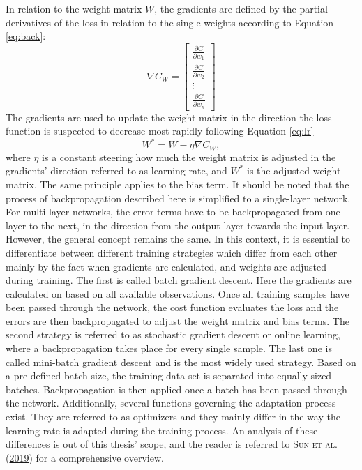 \documentclass[a4paper,11pt]{article}
\begin{document}
In relation to the weight matrix \(W\), the gradients are defined by the partial
derivatives of the loss in relation to the single weights according to Equation
\eqref{eq:back}:
\begin{equation}
\nabla{C_{W}} = 
\begin{bmatrix} \frac{\partial{C}}{\partial{w_1}} \\ 
\frac{\partial{C}}{\partial{w_2}} \\ 
\vdots \\ 
\frac{\partial{C}}{\partial{w_n}} 
\end{bmatrix}
\label{eq:back}
\end{equation}
The gradients are used to update the weight matrix in the direction
the loss function is suspected to decrease most rapidly following Equation \eqref{eq:lr}
\begin{equation}
W^* = W - \eta \nabla{C_{W}},
\label{eq:lr}
\end{equation}
where \(\eta\) is a constant steering how much the weight matrix is adjusted in the
gradients' direction referred to as learning rate, and \(W^*\) is the adjusted weight matrix.
The same principle applies to the bias term. It should be noted that the process
of backpropagation described here is simplified to a single-layer network. For
multi-layer networks, the error terms have to be backpropagated from one layer to
the next, in the direction from the output layer towards the input layer. However, the general concept
remains the same. In this context, it is essential to differentiate between
different training strategies which differ from each other mainly by the fact
when gradients are calculated, and weights are adjusted during training.
The first is called batch gradient descent. Here the gradients are calculated on
based on all available observations. Once all training samples have been
passed through the network, the cost function evaluates the loss and the errors
are then backpropagated to adjust the weight matrix and bias terms.
The second strategy is referred to as stochastic gradient descent or online learning,
where a backpropagation takes place for every single sample.
The last one is called mini-batch gradient descent and is the most widely used
strategy. Based on a pre-defined batch size, the training data set is separated
into equally sized batches. Backpropagation is then applied once a batch has been
passed through the network. Additionally, several functions governing the
adaptation process exist. They are referred to as optimizers and they mainly differ in
the way the learning rate is adapted during the training process. An analysis
of these differences is out of this thesis' scope, and the reader is referred
to \textsc{\textnormal{Sun} \textnormal{et al.}} \textsc{(\textnormal{\protect\hyperlink{ref-sun2019}{2019}})} for a comprehensive overview.
\end{document}
